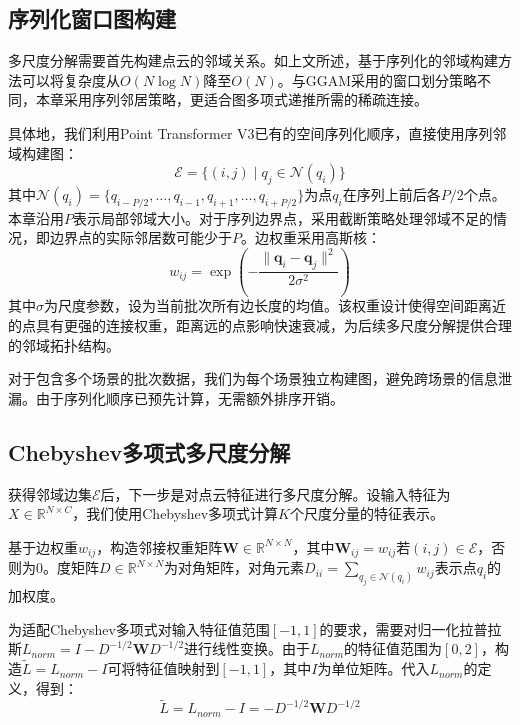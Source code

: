 \subsection{序列化窗口图构建}

多尺度分解需要首先构建点云的邻域关系。如上文所述，基于序列化的邻域构建方法可以将复杂度从$O(N\log N)$降至$O(N)$。与GGAM采用的窗口划分策略不同，本章采用序列邻居策略，更适合图多项式递推所需的稀疏连接。

具体地，我们利用Point Transformer V3已有的空间序列化顺序，直接使用序列邻域构建图：
\begin{equation}
\mathcal{E} = \{(i, j) \mid q_j \in \mathcal{N}(q_i)\}
\end{equation}
其中$\mathcal{N}(q_i) = \{q_{i-P/2}, \ldots, q_{i-1}, q_{i+1}, \ldots, q_{i+P/2}\}$为点$q_i$在序列上前后各$P/2$个点。本章沿用$P$表示局部邻域大小。对于序列边界点，采用截断策略处理邻域不足的情况，即边界点的实际邻居数可能少于$P$。边权重采用高斯核：
\begin{equation}
w_{ij} = \exp\left(-\frac{\|\mathbf{q}_i - \mathbf{q}_j\|^2}{2\sigma^2}\right)
\end{equation}
其中$\sigma$为尺度参数，设为当前批次所有边长度的均值。该权重设计使得空间距离近的点具有更强的连接权重，距离远的点影响快速衰减，为后续多尺度分解提供合理的邻域拓扑结构。

对于包含多个场景的批次数据，我们为每个场景独立构建图，避免跨场景的信息泄漏。由于序列化顺序已预先计算，无需额外排序开销。

\subsection{Chebyshev多项式多尺度分解}

获得邻域边集$\mathcal{E}$后，下一步是对点云特征进行多尺度分解。设输入特征为$X \in \mathbb{R}^{N \times C}$，我们使用Chebyshev多项式计算$K$个尺度分量的特征表示。

基于边权重$w_{ij}$，构造邻接权重矩阵$\mathbf{W} \in \mathbb{R}^{N \times N}$，其中$\mathbf{W}_{ij} = w_{ij}$若$(i,j) \in \mathcal{E}$，否则为0。度矩阵$D \in \mathbb{R}^{N \times N}$为对角矩阵，对角元素$D_{ii} = \sum_{q_j \in \mathcal{N}(q_i)} w_{ij}$表示点$q_i$的加权度。

为适配Chebyshev多项式对输入特征值范围$[-1, 1]$的要求，需要对归一化拉普拉斯$L_{norm} = I - D^{-1/2}\mathbf{W}D^{-1/2}$进行线性变换。由于$L_{norm}$的特征值范围为$[0, 2]$，构造$\tilde{L} = L_{norm} - I$可将特征值映射到$[-1, 1]$，其中$I$为单位矩阵。代入$L_{norm}$的定义，得到：
\begin{equation}
\tilde{L} = L_{norm} - I = -D^{-1/2}\mathbf{W}D^{-1/2}
\end{equation}

